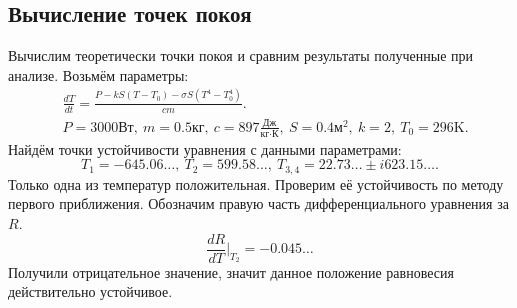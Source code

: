     \subsection{Вычисление точек покоя}
        Вычислим теоретически точки покоя и сравним результаты полученные при анализе. Возьмём параметры:
        \[
            \begin{split}
                & \frac{dT}{dt} = \frac{P - k S (T - T_0) - \sigma S (T^4 - T_0^4)}{cm}. \\
                & P = 3000 \text{Вт}, ~ m = 0.5 \text{кг}, ~ c = 897 \frac{\text{Дж}}{\text{кг} \cdot \text{К}}, ~ S = 0.4 \text{м}^2, ~ k = 2, ~ T_0 = 296 \text{K}.
            \end{split}
        \]
        Найдём точки устойчивости уравнения с данными параметрами:
        \[
            T_1 = -645.06\dots, ~
            T_2 = 599.58\dots, ~
            T_{3,4} = 22.73\dots \pm i 623.15\dots.
        \]
        Только одна из температур положительная. Проверим её устойчивость по методу первого приближения. Обозначим правую часть дифференциального уравнения за $ R $.
        \[
            \frac{dR}{dT}\big|_{T_2} = -0.045\dots
        \]
        Получили отрицательное значение, значит данное положение равновесия действительно устойчивое.